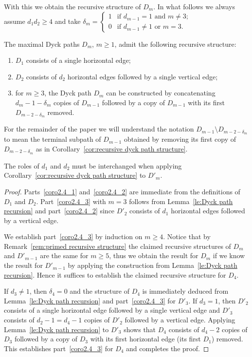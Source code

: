 With this we obtain the recursive structure of $D_m$. In what follows we always assume $d_1d_2\ge4$ and take $\delta_m=\begin{cases} 1 & \text{if $d_{m-1}=1$ and $m\ne3$;}\\ 0 & \text{if $d_{m-1}\ne1$ or $m=3$.}\end{cases}$
\begin{corollary}
 \label{cor:recursive dyck path structure}
 The maximal Dyck paths $D_m$, $m\ge1$, admit the following recursive structure:
 \begin{enumerate}[label=(\alph*)]
 \item\label{coro2.4_1} $D_1$ consists of a single horizontal edge;
 \item\label{coro2.4_2} $D_2$ consists of $d_2$ horizontal edges followed by a single vertical edge;
 \item\label{coro2.4_3} for $m\ge3$, the Dyck path $D_m$ can be constructed by concatenating $d_m-1-\delta_m$ copies of $D_{m-1}$ followed by a copy of $D_{m-1}$ with its first $D_{m-2-\delta_m}$ removed.
 \end{enumerate}
\end{corollary}
For the remainder of the paper we will understand the notation $D_{m-1}\setminus D_{m-2-\delta_m}$ to mean the terminal subpath of $D_{m-1}$ obtained by removing its first copy of $D_{m-2-\delta_m}$ as in Corollary~\ref{cor:recursive dyck path structure}.
\begin{remark}
 \label{rem:primed recursive structure}
 The roles of $d_1$ and $d_2$ must be interchanged when applying Corollary~\ref{cor:recursive dyck path structure} to $D'_m$.
\end{remark}
\begin{proof}
 Parts~\ref{coro2.4_1} and~\ref{coro2.4_2} are immediate from the definitions of $D_1$ and $D_2$. 
 Part~\ref{coro2.4_3} with $m=3$ follows from Lemma~\ref{le:Dyck path recursion} and part~\ref{coro2.4_2} since $D'_2$ consists of $d_1$ horizontal edges followed by a vertical edge. 

 We establish part~\ref{coro2.4_3} by induction on $m\ge4$. 
 Notice that by Remark~\ref{rem:primed recursive structure} the claimed recursive structures of $D_m$ and $D'_{m-1}$ are the same for $m\ge5$, thus we obtain the result for $D_m$ if we know the result for $D'_{m-1}$ by applying the construction from Lemma~\ref{le:Dyck path recursion}. 
 Hence it suffices to establish the claimed recursive structure for $D_4$. 

 If $d_3\ne1$, then $\delta_4=0$ and the structure of $D_4$ is immediately deduced from Lemma~\ref{le:Dyck path recursion} and part~\ref{coro2.4_3} for $D'_3$. 
 If $d_3=1$, then $D'_2$ consists of a single horizontal edge followed by a single vertical edge and $D'_3$ consists of $d_2-1=d_4-1$ copies of $D'_2$ followed by a vertical edge. 
 Applying Lemma~\ref{le:Dyck path recursion} to $D'_3$ shows that $D_4$ consists of $d_4-2$ copies of $D_3$ followed by a copy of $D_3$ with its first horizontal edge (\ie its first $D_1$) removed. 
 This establishes part~\ref{coro2.4_3} for $D_4$ and completes the proof.
\end{proof}
